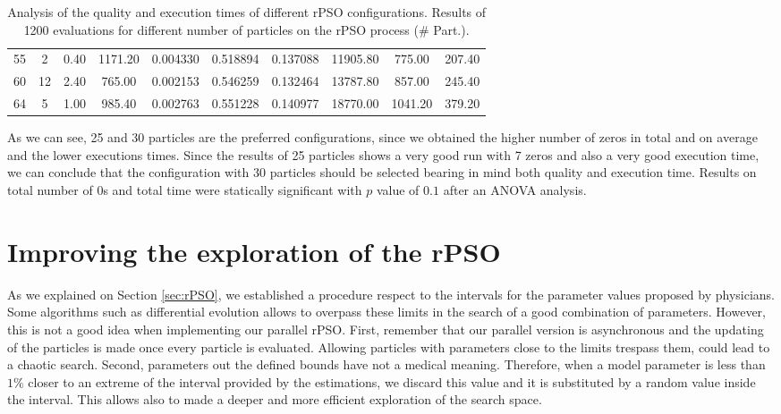 \begin{table}[h]
\begin{tabular}{cccccccccc}
		\cellcolor[HTML]{C0C0C0}55          & 2             & {\color[HTML]{FE0000} 0.40} & {\color[HTML]{FE0000} 1171.20} & 0.004330                        & 0.518894                        & 0.137088                        & 11905.80                        & 775.00                         & 207.40                        \\
		\cellcolor[HTML]{C0C0C0}60          & 12            & 2.40                        & 765.00                         & 0.002153                        & 0.546259                        & 0.132464                        & 13787.80                        & 857.00                         & 245.40                        \\
		\cellcolor[HTML]{C0C0C0}64          & 5             & 1.00                        & 985.40                         & 0.002763                        & 0.551228                        & 0.140977                        & {\color[HTML]{FE0000} 18770.00} & {\color[HTML]{FE0000} 1041.20} & {\color[HTML]{FE0000} 379.20} \\ \hline
	\end{tabular}
	\caption{Analysis of the quality and execution times of different rPSO configurations. Results of 1200 evaluations for different number of particles on the rPSO process (\# Part.).}
	\label{tab.color}
\end{table}

As we can see, 25 and 30 particles are the preferred configurations, since we obtained the higher number of zeros in total and on average and the lower executions times. Since the results of 25 particles shows a very good run with 7 zeros and also a very good execution time, we can conclude that the configuration with 30 particles should be selected bearing in mind both quality and execution time. Results on total number of 0s and total time were statically significant with $p$ value of $0.1$ after an ANOVA analysis.

\section{Improving the exploration of the rPSO}
As we explained on Section \ref{sec:rPSO}, we established a procedure respect to the intervals for the parameter values proposed by physicians. Some algorithms such as differential evolution \cite{storn1997differential} allows to overpass these limits in the search of a good combination of parameters. However, this is not a good idea when implementing our parallel rPSO. First, remember that our parallel version is asynchronous and the updating of the particles is made once every particle is evaluated. Allowing particles with parameters close to the limits trespass them, could lead to a chaotic search. Second, parameters out the defined bounds have not a medical meaning. Therefore, when a model parameter is less than $1\%$ closer to an extreme of the interval provided by the  estimations, we discard this value and it is substituted by a random value inside the interval. This allows also to made a deeper and more efficient exploration of the search space.

